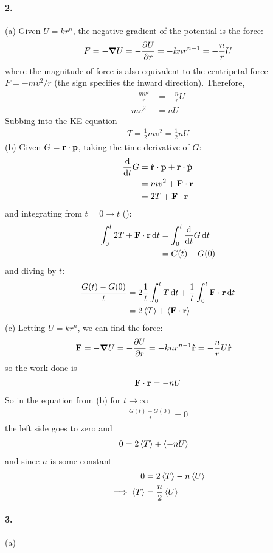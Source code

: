 \documentclass[../hw.tex]{subfiles}
\begin{document}
\paragraph*{2.} (a) Given $U = kr^n$, the negative gradient of the potential is the force:
\begin{align*}
    F = -\grad U = - \pdv{U}{r} = - kn r^{n-1} = - \frac{n}{r} U
\end{align*}
where the magnitude of force is also equivalent to the centripetal force $F = -mv^2/r$ (the sign
specifies the inward direction). Therefore,
\begin{align*}
    -\frac{mv^2}{r} &= -\frac{n}{r} U \\
    mv^2 &= n U
\end{align*}
Subbing into the KE equation
\begin{align*}
    T = \frac{1}{2} mv^2 = \frac{1}{2} nU
\end{align*}
(b) Given $G = \vb r \cdot \vb p$, taking the time derivative of $G$:
\begin{align}
    \dv{t} G &= \dot{\vb r} \cdot \vb p + \vb r \cdot \dot{\vb p} \\
    &= mv^2 + \vb F \cdot \vb r \\
    &= 2T + \vb F \cdot \vb r
\end{align}
and integrating from $t = 0 \to t$ ():
\begin{align*}
    \int_0^t 2 T + \vb F \cdot \vb r \dd{t} &= \int_0^t \dv{t} G \dd{t} \\
    &= G(t) - G(0)
\end{align*}
and diving by $t$:
\begin{align*}
    \frac{G(t) - G(0)}{t} &= 2 \frac{1}{t} \int_0^t T \dd{t} + \frac{1}{t} \int_0^t \vb F \cdot \vb r \dd{t} \\
    &= 2 \expval{T} + \expval{\vb F \cdot \vb r}
\end{align*}
(c) Letting $U = kr^n$, we can find the force:
\begin{align*}
    \vb F &= -\grad U = -\pdv{U}{r} = -kn r^{n-1} \vu r = -\frac{n}{r} U \vu r
\end{align*}
so the work done is
\begin{align*}
    \vb F \cdot \vb r = -n U
\end{align*}
So in the equation from (b) for $t \to \infty$
\begin{align*}
    \frac{G(t) - G(0)}{t} = 0
\end{align*}
the left side goes to zero and
\begin{align*}
    0 &= 2 \expval{T} + \expval{-nU}
\end{align*}
and since $n$ is some constant
\begin{align*}
    0 &= 2 \expval{T} - n \expval{U} \\
    \implies \expval{T} &= \frac{n}{2} \expval{U}
\end{align*}

\newpage
\paragraph*{3.} (a) 
\end{document}
